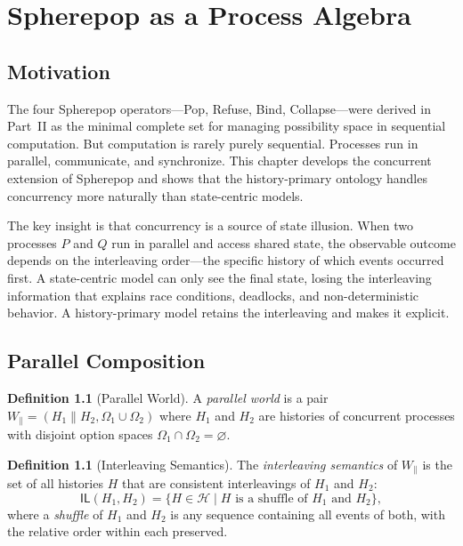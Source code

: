 \documentclass[12pt, a4paper, openany]{book}
\theoremstyle{plain}
\theoremstyle{definition}
\newtheorem{definition}[theorem]{Definition}
\theoremstyle{remark}
\newcommand{\calH}{\mathcal{H}}
\begin{document}
\chapter{Spherepop as a Process Algebra}

\section{Motivation}

The four Spherepop operators---Pop, Refuse, Bind, Collapse---were derived in
Part~II as the minimal complete set for managing possibility space in sequential
computation. But computation is rarely purely sequential. Processes run in
parallel, communicate, and synchronize. This chapter develops the concurrent
extension of Spherepop and shows that the history-primary ontology handles
concurrency more naturally than state-centric models.

The key insight is that concurrency is a source of state illusion. When two
processes $P$ and $Q$ run in parallel and access shared state, the observable
outcome depends on the interleaving order---the specific history of which events
occurred first. A state-centric model can only see the final state, losing the
interleaving information that explains race conditions, deadlocks, and
non-deterministic behavior. A history-primary model retains the interleaving
and makes it explicit.

\section{Parallel Composition}

\begin{definition}[Parallel World]
A \emph{parallel world} is a pair $W_\parallel = (H_1 \parallel H_2, \Omega_1
\cup \Omega_2)$ where $H_1$ and $H_2$ are histories of concurrent processes
with disjoint option spaces $\Omega_1 \cap \Omega_2 = \varnothing$.
\end{definition}

\begin{definition}[Interleaving Semantics]
The \emph{interleaving semantics} of $W_\parallel$ is the set of all histories
$H$ that are consistent interleavings of $H_1$ and $H_2$:
\[
\mathsf{IL}(H_1, H_2) = \{H \in \calH \mid H \text{ is a shuffle of } H_1
\text{ and } H_2\},
\]
where a \emph{shuffle} of $H_1$ and $H_2$ is any sequence containing all
events of both, with the relative order within each preserved.
\end{definition}
\end{document}
